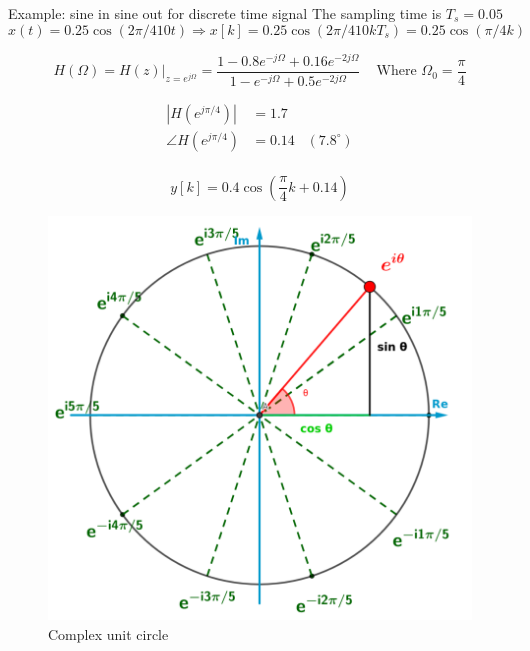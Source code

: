 \documentclass{article}
\begin{document}
\newpage
\begin{exampleblock}{Example: sine in sine out for discrete time signal}
    The sampling time is $T_s = 0.05$ 
    \begin{equation*}
        x(t) = 0.25\cos(2\pi/4 10 t) \Rightarrow x[k] = 0.25\cos(2\pi/4 10 k T_s) = 0.25\cos(\pi/4 k)
    \end{equation*}

    \begin{equation*}
        H(\Omega) = H(z)|_{z=e^{j\Omega}} = \frac{ 1 -0.8e^{-j\Omega} +0.16e^{-2j\Omega} }{ 1 -e^{-j\Omega} +0.5e^{-2j\Omega} } \;\;\; \text{ Where } \Omega_0 = \frac{\pi}{4}
    \end{equation*}

    \begin{align*}
        |H(e^{j\pi/4})| &= 1.7  \\
        \angle H(e^{j\pi/4}) &= 0.14 \;\;\; (7.8^{\circ}) \\
    \end{align*}

    \begin{equation*}
        y[k] = 0.4\cos(\frac{\pi}{4}k + 0.14)
    \end{equation*}
\end{exampleblock}
    


\newpage
\begin{appendices}

\begin{figure}[!h]
   \centering
   \includegraphics[width=12cm]{image/complex_unit_circle.png} 
   \caption{Complex unit circle}
   \label{fig:complex_unit_circle}
\end{figure}
\end{appendices}
   
\end{document}
